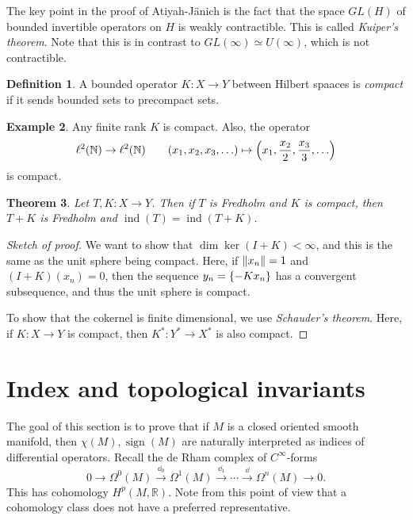 \documentclass[leqno, openany]{memoir}
\newtheorem{thm}{Theorem}[section]
\theoremstyle{definition}
\newtheorem{defn}[thm]{Definition}
\newtheorem{exm}[thm]{Example}
\theoremstyle{remark}
\theoremstyle{plain}
\theoremstyle{definition}
\theoremstyle{remark}
\newcommand{\N}{\mathbb{N}}
\newcommand{\R}{\mathbb{R}}
\DeclareMathOperator{\sign}{sign}
\DeclareMathOperator{\ind}{ind}
\begin{document}
The key point in the proof of Atiyah-J\"anich is the fact that the space $GL(H)$ of bounded invertible operators on $H$ is weakly contractible. This is called \textit{Kuiper's theorem}. Note that this is in contrast to $GL(\infty) \simeq U(\infty)$, which is not contractible.

\begin{defn}
    A bounded operator $K \colon X \to Y$ between Hilbert spaaces is \textit{compact} if it sends bounded sets to precompact sets.
\end{defn}

\begin{exm}
    Any finite rank $K$ is compact. Also, the operator 
    \[ \ell^2(\N) \to \ell^2(\N) \qquad (x_1, x_2, x_3, \ldots) \mapsto \qty(x_1, \frac{x_2}{2}, \frac{x_3}{3}, \ldots) \]
    is compact.
\end{exm}

\begin{thm}
    Let $T, K \colon X \to Y$. Then if $T$ is Fredholm and $K$ is compact, then $T+K$ is Fredholm and $\ind(T) = \ind(T+K)$.
\end{thm}

\begin{proof}[Sketch of proof]
    We want to show that $\dim \ker(I+K) < \infty$, and this is the same as the unit sphere being compact. Here, if $\norm{x_n} = 1$ and $(I+K)(x_n) = 0$, then the sequence $y_n = \qty{-K x_n}$ has a convergent subsequence, and thus the unit sphere is compact.

    To show that the cokernel is finite dimensional, we use \textit{Schauder's theorem}. Here, if $K \colon X \to Y$ is compact, then $K^* \colon Y^* \to X^*$ is also compact. 
\end{proof}

\section{Index and topological invariants}%
\label{sec:index_and_topological_invariants}

The goal of this section is to prove that if $M$ is a closed oriented smooth manifold, then $\chi(M), \sign(M)$ are naturally interpreted as indices of differential operators. Recall the de Rham complex of $C^{\infty}$-forms
\[ 0 \to \Omega^0(M) \xrightarrow{\dd_0} \Omega^1(M) \xrightarrow{\dd_1} \cdots \xrightarrow{\dd} \Omega^n (M) \to 0. \]
This has cohomology $H^p(M, \R)$. Note from this point of view that a cohomology class does not have a preferred representative. 
\end{document}
